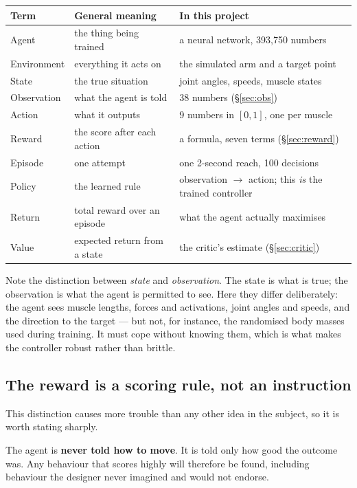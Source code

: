 \begin{longtable}{@{} L{3.0cm} L{5.2cm} L{7.4cm} @{}}
\toprule
\textbf{Term} & \textbf{General meaning} & \textbf{In this project} \\
\midrule
\endhead
Agent & the thing being trained & a neural network, 393{,}750 numbers \\
Environment & everything it acts on & the simulated arm and a target point \\
State & the true situation & joint angles, speeds, muscle states \\
Observation & what the agent is told & 38 numbers (\S\ref{sec:obs}) \\
Action & what it outputs & 9 numbers in $[0,1]$, one per muscle \\
Reward & the score after each action & a formula, seven terms (\S\ref{sec:reward}) \\
Episode & one attempt & one 2-second reach, 100 decisions \\
Policy & the learned rule & observation $\rightarrow$ action; this \emph{is} the trained controller \\
Return & total reward over an episode & what the agent actually maximises \\
Value & expected return from a state & the critic's estimate (\S\ref{sec:critic}) \\
\bottomrule
\end{longtable}

\begin{why}
Note the distinction between \emph{state} and \emph{observation}. The state is
what is true; the observation is what the agent is permitted to see. Here they
differ deliberately: the agent sees muscle lengths, forces and activations, joint
angles and speeds, and the direction to the target --- but not, for instance, the
randomised body masses used during training. It must cope without knowing them,
which is what makes the controller robust rather than brittle.
\end{why}

\subsection{The reward is a scoring rule, not an instruction}

This distinction causes more trouble than any other idea in the subject, so it is
worth stating sharply.

The agent is \textbf{never told how to move}. It is told only how good the
outcome was. Any behaviour that scores highly will therefore be found, including
behaviour the designer never imagined and would not endorse.

